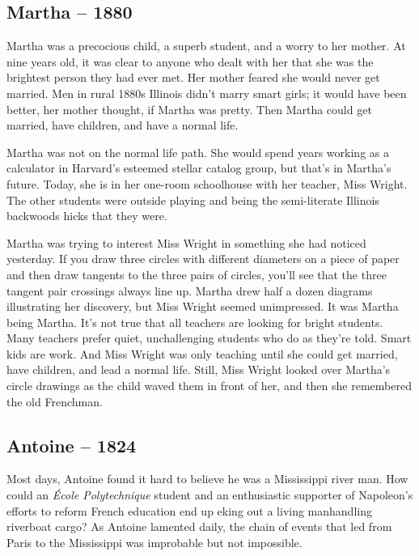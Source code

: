 \hypertarget{martha-1880}{%
\subsection*{Martha -- 1880}\label{martha-1880}}

Martha was a precocious child, a superb student, and a worry to her
mother. At nine years old, it was clear to anyone who dealt with her
that she was the brightest person they had ever met. Her mother feared
she would never get married. Men in rural 1880s Illinois didn't marry
smart girls; it would have been better, her mother thought, if Martha
was pretty. Then Martha could get married, have children, and have a
normal life.

Martha was not on the normal life path. She would spend years working as
a calculator in Harvard's esteemed stellar catalog group, but that's in
Martha's future. Today, she is in her one-room schoolhouse with her
teacher, Miss Wright. The other students were outside playing and being
the semi-literate Illinois backwoods hicks that they were.

Martha was trying to interest Miss Wright in something she had noticed
yesterday. If you draw three circles with different diameters on a piece
of paper and then draw tangents to the three pairs of circles, you'll
see that the three tangent pair crossings always line up. Martha drew
half a dozen diagrams illustrating her discovery, but Miss Wright seemed
unimpressed. It was Martha being Martha. It's not true that all teachers
are looking for bright students. Many teachers prefer quiet,
unchallenging students who do as they're told. Smart kids are work. And
Miss Wright was only teaching until she could get married, have
children, and lead a normal life. Still, Miss Wright looked over
Martha's circle drawings as the child waved them in front of her, and
then she remembered the old Frenchman.

\hypertarget{antoine-1824}{%
\subsection*{Antoine -- 1824}\label{antoine-1824}}

Most days, Antoine found it hard to believe he was a Mississippi river
man. How could an \emph{École Polytechnique} student and an enthusiastic
supporter of Napoleon's efforts to reform French education end up eking
out a living manhandling riverboat cargo? As Antoine lamented daily, the
chain of events that led from Paris to the Mississippi was improbable
but not impossible.


